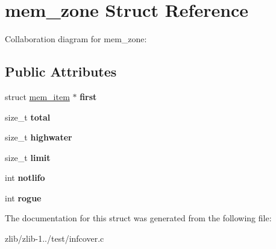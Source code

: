 \hypertarget{structmem__zone}{\section{mem\+\_\+zone Struct Reference}
\label{structmem__zone}
}


Collaboration diagram for mem\+\_\+zone\+:
\subsection*{Public Attributes}
\begin{DoxyCompactItemize}
\item 
\hypertarget{structmem__zone_a505ee12b879388445657996d73536d85}{struct \hyperlink{structmem__item}{mem\+\_\+item} $\ast$ {\bfseries first}}\label{structmem__zone_a505ee12b879388445657996d73536d85}

\item 
\hypertarget{structmem__zone_a6b70eb61d9853f1280d51c0e30464b60}{size\+\_\+t {\bfseries total}}\label{structmem__zone_a6b70eb61d9853f1280d51c0e30464b60}

\item 
\hypertarget{structmem__zone_ade7307da7e51243cb854f6572d3793ea}{size\+\_\+t {\bfseries highwater}}\label{structmem__zone_ade7307da7e51243cb854f6572d3793ea}

\item 
\hypertarget{structmem__zone_a6c74826ce14e9f88852730eff93812d1}{size\+\_\+t {\bfseries limit}}\label{structmem__zone_a6c74826ce14e9f88852730eff93812d1}

\item 
\hypertarget{structmem__zone_abbf8b6ad868dbd00922cd79b0218be8d}{int {\bfseries notlifo}}\label{structmem__zone_abbf8b6ad868dbd00922cd79b0218be8d}

\item 
\hypertarget{structmem__zone_add0baffc4114f0576ed2fc7eb8de21c6}{int {\bfseries rogue}}\label{structmem__zone_add0baffc4114f0576ed2fc7eb8de21c6}

\end{DoxyCompactItemize}


The documentation for this struct was generated from the following file\+:\begin{DoxyCompactItemize}
\item 
zlib/zlib-\/1../test/infcover.\+c\end{DoxyCompactItemize}
